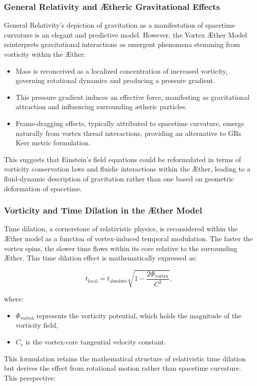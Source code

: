 \subsubsection*{General Relativity and Ætheric Gravitational Effects}
General Relativity's depiction of gravitation as a manifestation of spacetime curvature is an elegant and predictive model.
However, the Vortex Æther Model reinterprets gravitational interactions as emergent phenomena stemming from vorticity within the Æther:

\begin{itemize}
    \item Mass is reconceived as a localized concentration of increased vorticity, governing rotational dynamics and producing a pressure gradient.
    \item This pressure gradient induces an effective force, manifesting as gravitational attraction and influencing surrounding ætheric particles.
    \item Frame-dragging effects, typically attributed to spacetime curvature, emerge naturally from vortex thread interactions, providing an alternative to GR\rqs s Kerr metric formulation.
\end{itemize}
This suggests that Einstein's field equations could be reformulated in terms of vorticity conservation laws and fluidic interactions within the Æther, leading to a fluid-dynamic description of gravitation rather than one based on geometric deformation of spacetime.

\subsubsection*{Vorticity and Time Dilation in the Æther Model}
Time dilation, a cornerstone of relativistic physics, is reconsidered within the Æther model as a function of vortex-induced temporal modulation.
The faster the vortex spins, the slower time flows within its core relative to the surrounding Æther.
This time dilation effect is mathematically expressed as:

\begin{equation*}
    t_\text{local} = t_\text{absolute} \sqrt{1 - \frac{2 \Phi_\text{vortex}}{C^2}}.\label{eq:TimeDilation}
\end{equation*}

where:

\begin{itemize}
    \item $\Phi_\text{vortex}$ represents the vorticity potential, which holds the magnitude of the vorticity field,
    \item $C_e$ is the vortex-core tangential velocity constant.
\end{itemize}
This formulation retains the mathematical structure of relativistic time dilation but derives the effect from rotational motion rather than spacetime curvature.
This perspective:

